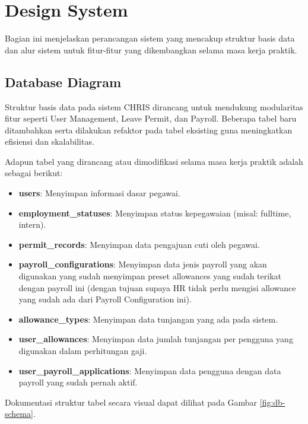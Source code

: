 \section{Design System}
Bagian ini menjelaskan perancangan sistem yang mencakup struktur basis data dan alur sistem untuk fitur-fitur yang dikembangkan selama masa kerja praktik.

\subsection{Database Diagram}
Struktur basis data pada sistem CHRIS dirancang untuk mendukung modularitas fitur seperti User Management, Leave Permit, dan Payroll. 
Beberapa tabel baru ditambahkan serta dilakukan refaktor pada tabel eksisting guna meningkatkan efisiensi dan skalabilitas.

Adapun tabel yang dirancang atau dimodifikasi selama masa kerja praktik adalah sebagai berikut:

\begin{itemize}
    \item \textbf{users}: Menyimpan informasi dasar pegawai.
    \item \textbf{employment\_statuses}: Menyimpan status kepegawaian (misal: fulltime, intern).
    \item \textbf{permit\_records}: Menyimpan data pengajuan cuti oleh pegawai.
    \item \textbf{payroll\_configurations}: Menyimpan data jenis payroll yang akan digunakan yang sudah menyimpan preset allowances yang sudah terikat dengan payroll ini (dengan tujuan supaya HR tidak perlu mengisi allowance yang sudah ada dari Payroll Configuration ini).
    \item \textbf{allowance\_types}: Menyimpan data tunjangan yang ada pada sistem.
    \item \textbf{user\_allowances}: Menyimpan data jumlah tunjangan per pengguna yang digunakan dalam perhitungan gaji.
    \item \textbf{user\_payroll\_applications}: Menyimpan data pengguna dengan data payroll yang sudah pernah aktif.
\end{itemize}

\noindent Dokumentasi struktur tabel secara visual dapat dilihat pada Gambar \ref{fig:db-schema}.

